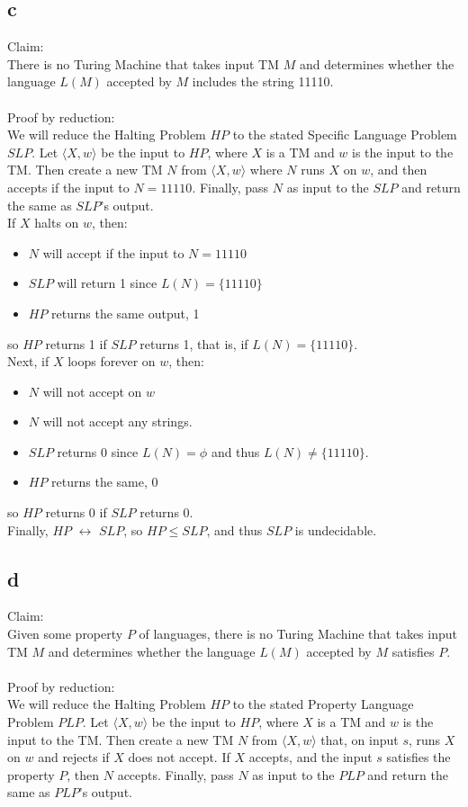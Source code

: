 \documentclass[letterpaper,notitlepage,twoside]{article}
\begin{document}
\subsection*{c}
Claim:\\
There is no Turing Machine that takes input TM $M$ and determines whether the language $L(M)$ accepted by $M$ includes the string 11110.\\\\
Proof by reduction:\\
We will reduce the Halting Problem $HP$ to the stated Specific Language Problem $SLP$. Let $\langle X, w \rangle$ be the input to $HP$, where $X$ is a TM and $w$ is the input to the TM.  Then create a new TM $N$ from $\langle X, w \rangle$ where $N$ runs $X$ on $w$, and then accepts if the input to $N = 11110$. Finally, pass $N$ as input to the $SLP$ and return the same as $SLP$'s output.\\
If $X$ halts on $w$, then:
\begin{itemize}
\item $N$ will accept if the input to $N = 11110$
\item $SLP$ will return 1 since $L(N) = \{11110\}$
\item $HP$ returns the same output, 1
\end{itemize}
so $HP$ returns 1 if $SLP$ returns 1, that is, if $L(N) = \{11110\}$.\\
Next, if $X$ loops forever on $w$, then:
\begin{itemize}
\item $N$ will not accept on $w$
\item $N$ will not accept any strings.
\item $SLP$ returns 0 since $L(N) = \phi$ and thus $L(N) \neq \{11110\}$.
\item $HP$ returns the same, 0
\end{itemize}
so $HP$ returns 0 if $SLP$ returns 0.\\
Finally, $HP$ $\leftrightarrow$ $SLP$, so $HP \le SLP$, and thus $SLP$ is undecidable.
\subsection*{d}
Claim:\\
Given some property $P$ of languages, there is no Turing Machine that takes input TM $M$ and determines whether the language $L(M)$ accepted by $M$ satisfies $P$.\\\\
Proof by reduction:\\
We will reduce the Halting Problem $HP$ to the stated Property Language Problem $PLP$. Let $\langle X, w \rangle$ be the input to $HP$, where $X$ is a TM and $w$ is the input to the TM. Then create a new TM $N$ from $\langle X, w \rangle$ that, on input $s$, runs $X$ on $w$ and rejects if $X$ does not accept. If $X$ accepts, and the input $s$ satisfies the property $P$, then $N$ accepts. Finally, pass $N$ as input to the $PLP$ and return the same as $PLP$'s output.
\end{document}
